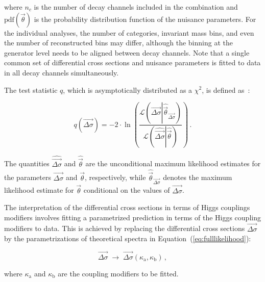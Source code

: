 % 
where $n_c$ is the number of decay channels included in the combination
and $\text{pdf}(\vec{\theta})$ is the probability distribution function of the nuisance parameters.
% 
For the individual analyses, the number of categories, invariant mass bins, and even the number of reconstructed bins may differ, although the binning at the generator level needs to be aligned between decay channels.
% 
Note that a single common set of differential cross sections and nuisance parameters is fitted to data in all decay channels simultaneously.


The test statistic $q$, which is asymptotically distributed as a $\chi^2$, is defined as~\cite{Cowan:2010js}:
% 
\begin{linenomath*}
\begin{equation}
q(\vec{\Delta\sigma}) = -2 \cdot \ln \left(
    \frac{
        \mathcal{L}
            \left(
            \vec{\Delta\sigma} \left| \hat{\vec{\theta}}_{\vec{\Delta\sigma}}
            \right)\right.
        }{
        \mathcal{L}
            \left(
            \hat{\vec{\Delta\sigma}} \left| \hat{\vec{\theta}}
            \right)\right.
        }
\right)
\,.
\label{eq:TestStatisticQ}
\end{equation}
\end{linenomath*}
% 
The quantities $\hat{\vec{\Delta\sigma}}$ and $\hat{\vec{\theta}}$ are the unconditional maximum likelihood estimates for the parameters $\vec{\Delta\sigma}$ and $\vec{\theta}$, respectively, while $\hat{\vec{\theta}}_{\vec{\Delta\sigma}}$ denotes the maximum likelihood estimate for $\vec{\theta}$ conditional on the values of $\vec{\Delta\sigma}$.


The interpretation of the differential cross sections in terms of Higgs couplings modifiers involves fitting a parametrized prediction in terms of the Higgs coupling modifiers to data.
% 
This is achieved by replacing the differential cross sections $\vec{\Delta\sigma}$ by the parametrizations of theoretical spectra in Equation~(\ref{eq:fulllikelihood}):
% 
\begin{linenomath*}
\begin{equation}
\label{eq:likelihood-interpretation}
    \vec{\Delta\sigma} \; \to \; \vec{\Delta\sigma}( \kappa_\text{a}, \kappa_\text{b} )
    \,,
\end{equation}
\end{linenomath*}
% 
where $\kappa_\text{a}$ and $\kappa_\text{b}$ are the coupling modifiers to be fitted.


